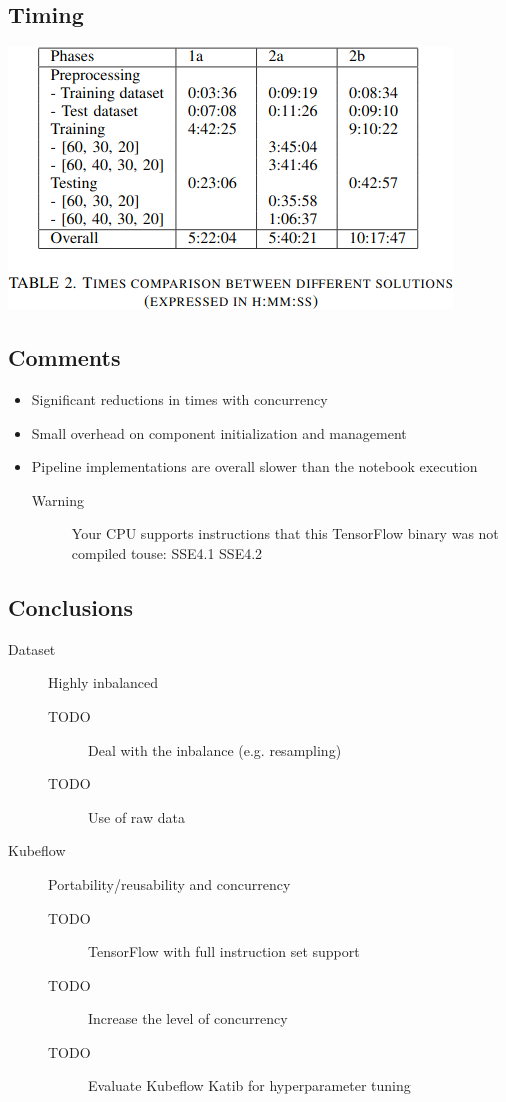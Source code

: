 \documentclass[11pt]{article}
\begin{document}
\subsection*{Timing}
\label{sec:org705ee67}
\begin{center}
\includegraphics[width=.9\linewidth]{./img/timing.png}
\end{center}
\subsection*{Comments}
\label{sec:org1bc1c0a}
\begin{itemize}
\item Significant reductions in times with concurrency
\item Small overhead on component initialization and management
\item Pipeline implementations are overall slower than the notebook
execution
\begin{description}
\item[{Warning}] Your CPU supports instructions that this TensorFlow
binary was not compiled touse: SSE4.1 SSE4.2
\end{description}
\end{itemize}
\subsection*{Conclusions}
\label{sec:org67e09be}
\begin{description}
\item[{Dataset}] Highly inbalanced
\begin{description}
\item[{TODO}] Deal with the inbalance (e.g. resampling)
\item[{TODO}] Use of raw data
\end{description}
\item[{Kubeflow}] Portability/reusability and concurrency
\begin{description}
\item[{TODO}] TensorFlow with full instruction set support
\item[{TODO}] Increase the level of concurrency
\item[{TODO}] Evaluate Kubeflow Katib for hyperparameter tuning
\end{description}
\end{description}
\end{document}

